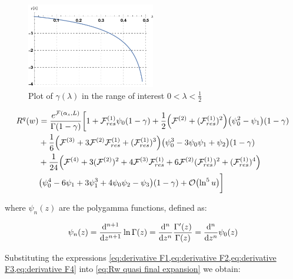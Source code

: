 \documentclass[../main.tex]{subfiles}
\begin{document}
\begin{figure}
    \centering
    \includegraphics[width=0.5\textwidth]{figures/gamma_lambda.png}
    \caption{Plot of $\gamma(\lambda)$ in the range of interest $0<\lambda<\frac{1}{2}$}
    \label{fig:gamma_lambda}
\end{figure}

\begin{align}
    \begin{split}\label{eq:Rw quasi final expansion}
        R^q(w) &= \frac{e^{\mathcal{F}(\alpha_s,L)}}{\Gamma(1-\gamma)} \biggl[ 1 + \mathcal{F}^{(1)}_{res} \psi_0(1-\gamma) + \frac{1}{2}\qty( \mathcal{F}^{(2)}+(\mathcal{F}^{(1)}_{res})^2) \qty(\psi_0^2-\psi_1)(1-\gamma) \\
        &+ \frac{1}{6}\qty(\mathcal{F}^{(3)} + 3 \mathcal{F}^{(2)}\mathcal{F}^{(1)}_{res} + (\mathcal{F}^{(1)}_{res})^3 ) \qty(\psi_0^3 -3 \psi_0\psi_1+\psi_2)(1-\gamma) \\
        &+ \frac{1}{24}\qty(\mathcal{F}^{(4)} + 3(\mathcal{F}^{(2)})^2 + 4 \mathcal{F}^{(3)} \mathcal{F}^{(1)}_{res} + 6 \mathcal{F}^{(2)} (\mathcal{F}^{(1)}_{res})^2 + (\mathcal{F}^{(1)}_{res})^4 ) \\
        &\qty(\psi_0^4 -6 \psi_1 + 3\psi_1^3 +4\psi_0\psi_2 -\psi_3)(1-\gamma)+ \order{\ln^5 u} \biggr]
    \end{split}
\end{align}

where $\psi_n(z)$ are the polygamma functions, defined as:

\begin{equation}
    \psi_n (z) = \dv[n+1]{z} \ln \Gamma(z) = \dv[n]{z} \frac{\Gamma '(z)}{\Gamma(z)} = \dv[n]{z} \psi_0(z)
\end{equation}

Substituting the expressions \cref{eq:derivative F1,eq:derivative F2,eq:derivative F3,eq:derivative F4} into \cref{eq:Rw quasi final expansion} we obtain:
\end{document}
